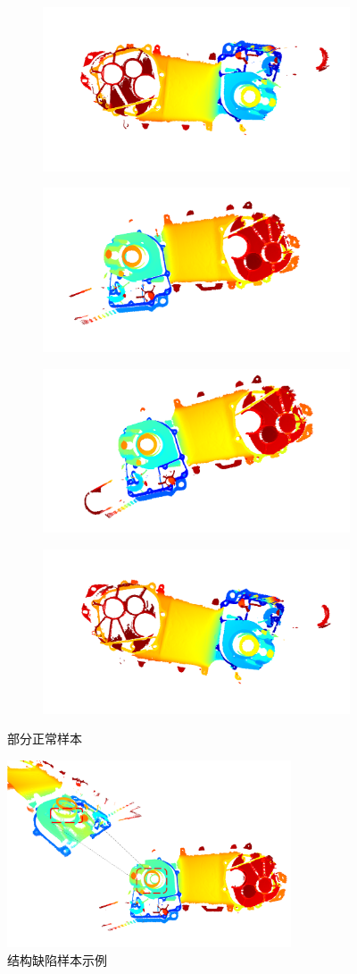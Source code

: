   \begin{figure}[htbp]
    \centering
    \begin{subfigure}
        \centering
        \includegraphics[width=.4\linewidth]{figures/3/good-1.png}  
      \end{subfigure}
      \begin{subfigure}
        \centering
        \includegraphics[width=.4\linewidth]{figures/3/good-2.png} 
      \end{subfigure}
      \begin{subfigure}
        \centering
        \includegraphics[width=.4\linewidth]{figures/3/good-3.png}  
      \end{subfigure}
      \begin{subfigure}
        \centering
        \includegraphics[width=.4\linewidth]{figures/3/good-4.png} 
      \end{subfigure}
    \caption{部分正常样本}
    \label{fig:normalxy}
  \end{figure}

  \begin{figure}[htbp]
    \centering
    \includegraphics[width=0.75\textwidth]{figures/3/bad.png}
    \caption{结构缺陷样本示例}
    \label{fig:bad}
\end{figure}

